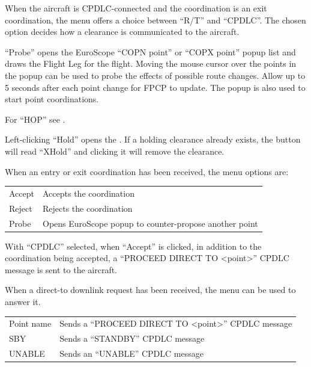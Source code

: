 \documentclass[a4paper,oneside,11pt]{memoir}
\begin{document}

\bigskip

When the aircraft is CPDLC-connected and the coordination is an exit coordination, the menu offers a choice between “R/T” and “CPDLC”. The chosen option decides how a clearance is communicated to the aircraft.

\bigskip

“Probe” opens the EuroScope “COPN point” or “COPX point” popup list and draws the Flight Leg for the flight. Moving the mouse cursor over the points in the popup can be used to probe the effects of possible route changes. Allow up to 5 seconds after each point change for FPCP to update. The popup is also used to start point coordinations.

\bigskip

For “HOP” see .

\bigskip

Left-clicking “Hold” opens the . If a holding clearance already exists, the button will read “XHold” and clicking it will remove the clearance.


When an entry or exit coordination has been received, the menu options are:

\begin{longtable}{p{5cm} p{7.5cm}}
Accept                    & Accepts the coordination\\
Reject                    & Rejects the coordination\\
Probe                     & Opens EuroScope popup to counter-propose another point\\
\end{longtable}

With “CPDLC” selected, when “Accept” is clicked, in addition to the coordination being accepted, a “PROCEED DIRECT TO <point>” CPDLC message is sent to the aircraft.


When a direct-to downlink request has been received, the menu can be used to answer it.

\bigskip

\begin{longtable}{p{5cm} p{7.5cm}}
Point name  & Sends a “PROCEED DIRECT TO <point>” CPDLC message\\
SBY         & Sends a “STANDBY” CPDLC message\\
UNABLE      & Sends an “UNABLE” CPDLC message\\
\end{longtable}   
\end{document}
